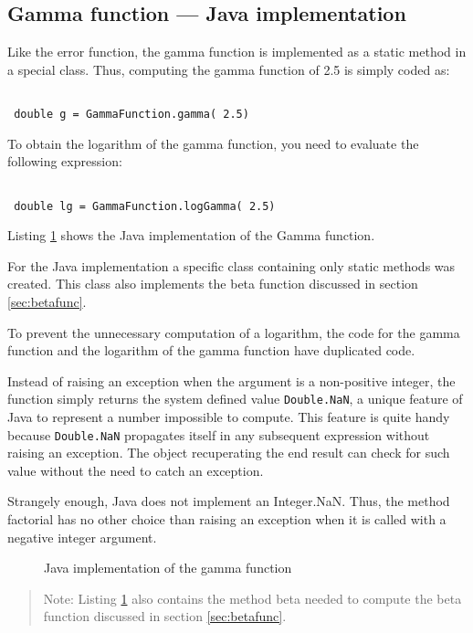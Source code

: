 \documentclass[twoside]{book}
\begin{document}
\subsection{Gamma function --- Java implementation}
 Like the error function, the gamma
function is implemented as a static method in a special class.
Thus, computing the gamma function of 2.5 is simply coded as:
\begin{codeExample}
\begin{verbatim}

 double g = GammaFunction.gamma( 2.5)
\end{verbatim}
\end{codeExample}
To obtain the logarithm of the gamma function, you need to
evaluate the following expression:
\begin{codeExample}
\begin{verbatim}

 double lg = GammaFunction.logGamma( 2.5)
\end{verbatim}
\end{codeExample}
Listing \ref{lj:gammafunc} shows the Java implementation of the
Gamma function.

For the Java implementation a specific class containing only
static methods was created. This class also implements the beta
function discussed in section \ref{sec:betafunc}.

To prevent the unnecessary computation of a logarithm, the code
for the gamma function and the logarithm of the gamma function
have duplicated code.

Instead of raising an exception when the argument is a
non-positive integer, the function simply returns the system
defined value {\tt Double.NaN}, a unique feature of Java to
represent a number impossible to compute. This feature is quite
handy because {\tt Double.NaN} propagates itself in any subsequent
expression without raising an exception. The object recuperating
the end result can check for such value without the need to catch
an exception.

Strangely enough, Java does not implement an Integer.NaN. Thus,
the method factorial has no other choice than raising an exception
when it is called with a negative integer argument.

\begin{figure}
\begin{listing}
\caption{Java implementation of the gamma function}
\label{lj:gammafunc}

\end{listing}
\end{figure}
\begin{quote}
Note: Listing \ref{lj:gammafunc} also contains the method beta
needed to compute the beta function discussed in section
\ref{sec:betafunc}.
\end{quote}
\end{document}
